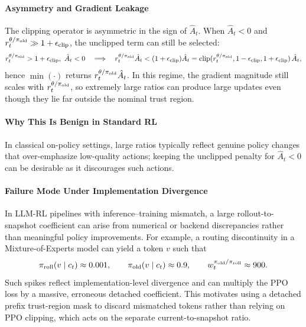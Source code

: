 \paragraph{Asymmetry and Gradient Leakage}
The clipping operator is asymmetric in the sign of $\hat{A}_t$. When
$\hat{A}_t<0$ and $r_t^{\theta/\pi_{\mathrm{old}}} \gg 1+\epsilon_{\mathrm{clip}}$, the
unclipped term can still be selected:
\begin{equation*}
    r_t^{\theta/\pi_{\mathrm{old}}} > 1+\epsilon_{\mathrm{clip}},\ \hat{A}_t<0
    \quad\Longrightarrow\quad
    r_t^{\theta/\pi_{\mathrm{old}}}\hat{A}_t < (1+\epsilon_{\mathrm{clip}})\hat{A}_t
    = \mathrm{clip}(r_t^{\theta/\pi_{\mathrm{old}}}, 1-\epsilon_{\mathrm{clip}}, 1+\epsilon_{\mathrm{clip}})\,\hat{A}_t,
\end{equation*}
hence $\min(\cdot)$ returns $r_t^{\theta/\pi_{\mathrm{old}}}\hat{A}_t$. In this regime, the gradient magnitude still scales with
$r_t^{\theta/\pi_{\mathrm{old}}}$, so extremely large ratios
can produce large updates even though they lie far outside the nominal trust region.

\paragraph{Why This Is Benign in Standard RL}
In classical on-policy settings, large ratios typically reflect genuine policy changes that over-emphasize low-quality actions; keeping the
unclipped penalty for $\hat{A}_t<0$ can be desirable as it discourages such actions.

\paragraph{Failure Mode Under Implementation Divergence}
In LLM-RL pipelines with inference--training mismatch, a large
rollout-to-snapshot coefficient can arise from numerical or backend
discrepancies rather than meaningful policy improvements. For example, a
routing discontinuity in a Mixture-of-Experts model can yield a token $v$ such that
\begin{equation*}
    \pi_{\mathrm{roll}}(v\mid c_t) \approx 0.001,
    \qquad
    \pi_{\mathrm{old}}(v\mid c_t) \approx 0.9,
    \qquad
    w_t^{\pi_{\mathrm{old}}/\pi_{\mathrm{roll}}} \approx 900.
\end{equation*}
Such spikes reflect implementation-level divergence and can multiply the
PPO loss by a massive, erroneous detached coefficient. This motivates using
a detached prefix trust-region mask to discard mismatched tokens rather than
relying on PPO clipping, which acts on the separate current-to-snapshot ratio.


